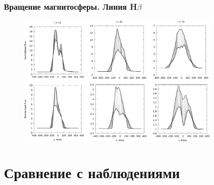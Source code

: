 \documentclass{beamer}
\begin{document}

\begin{frame}
\frametitle{Вращение магнитосферы. Линия H$\beta$}
\begin{figure}[h]
\centering
\includegraphics[width=0.9\textwidth]{rot.eps}
\end{figure}
\end{frame}


\section{Сравнение с наблюдениями}
\end{document}
